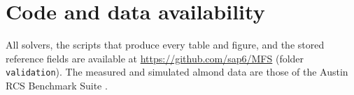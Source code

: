 \documentclass[preprint,12pt]{elsarticle}
\begin{document}
\section*{Code and data availability}
All solvers, the scripts that produce every table and figure, and the stored reference fields are available at \url{https://github.com/sap6/MFS} (folder \texttt{validation}). The measured and simulated almond data are those of the Austin RCS Benchmark Suite \cite{kelley2020}.


\appendix




\end{document}
